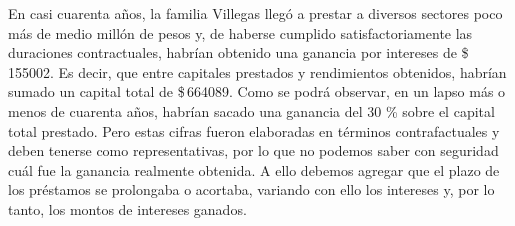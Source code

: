\documentclass[14pt,twoside,final]{extbook} %
\begin{document}
En casi cuarenta años, la familia Villegas llegó a prestar a diversos sectores poco más de medio millón de pesos y, de haberse cumplido satisfactoriamente las duraciones contractuales, habrían obtenido una ganancia por intereses de \$\,155002. Es decir, que entre capitales prestados y rendimientos obtenidos, habrían sumado un capital total de \$\,664089. Como se podrá observar, en un lapso más o menos de cuarenta años, habrían sacado una ganancia del 30 \% sobre el capital total prestado. Pero estas cifras fueron elaboradas en términos contrafactuales y deben tenerse como representativas, por lo que no podemos saber con seguridad cuál fue la ganancia realmente obtenida. A ello debemos agregar que el plazo de los préstamos se prolongaba o acortaba, variando con ello los intereses y, por lo tanto, los montos de intereses ganados.
\end{document}
